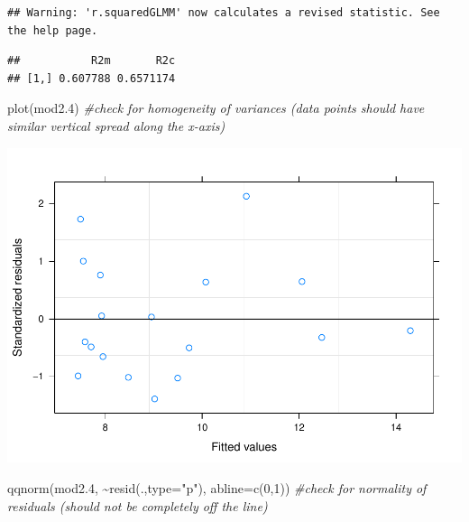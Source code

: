 \documentclass[
]{article}
\newenvironment{Shaded}{\begin{snugshade}}{\end{snugshade}}
\newcommand{\AttributeTok}[1]{\textcolor[rgb]{0.77,0.63,0.00}{#1}}
\newcommand{\CommentTok}[1]{\textcolor[rgb]{0.56,0.35,0.01}{\textit{#1}}}
\newcommand{\DecValTok}[1]{\textcolor[rgb]{0.00,0.00,0.81}{#1}}
\newcommand{\FloatTok}[1]{\textcolor[rgb]{0.00,0.00,0.81}{#1}}
\newcommand{\FunctionTok}[1]{\textcolor[rgb]{0.00,0.00,0.00}{#1}}
\newcommand{\NormalTok}[1]{#1}
\newcommand{\SpecialCharTok}[1]{\textcolor[rgb]{0.00,0.00,0.00}{#1}}
\newcommand{\StringTok}[1]{\textcolor[rgb]{0.31,0.60,0.02}{#1}}
\begin{document}
\begin{verbatim}
## Warning: 'r.squaredGLMM' now calculates a revised statistic. See the help page.
\end{verbatim}

\begin{verbatim}
##           R2m       R2c
## [1,] 0.607788 0.6571174
\end{verbatim}

\begin{Shaded}
\begin{Highlighting}[]
\FunctionTok{plot}\NormalTok{(mod2}\FloatTok{.4}\NormalTok{) }\CommentTok{\#check for homogeneity of variances (data points should have similar vertical spread along the x{-}axis)}
\end{Highlighting}
\end{Shaded}

\includegraphics{birdsdataanalysis_files/figure-latex/unnamed-chunk-8-1.pdf}

\begin{Shaded}
\begin{Highlighting}[]
\FunctionTok{qqnorm}\NormalTok{(mod2}\FloatTok{.4}\NormalTok{, }\SpecialCharTok{\textasciitilde{}}\FunctionTok{resid}\NormalTok{(.,}\AttributeTok{type=}\StringTok{"p"}\NormalTok{), }\AttributeTok{abline=}\FunctionTok{c}\NormalTok{(}\DecValTok{0}\NormalTok{,}\DecValTok{1}\NormalTok{)) }\CommentTok{\#check for normality of residuals (should not be completely off the line)}
\end{Highlighting}
\end{Shaded}
\end{document}
